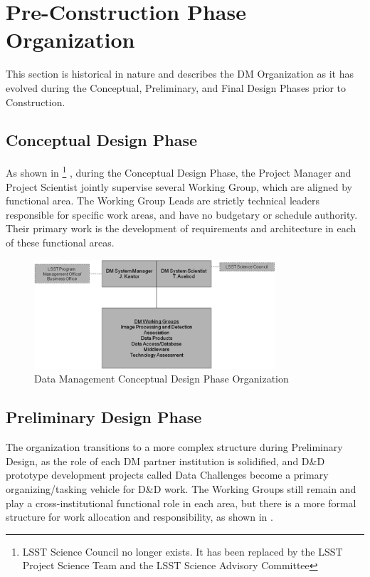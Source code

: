 \section{Pre-Construction Phase Organization}\label{sect:precon}
This section is historical in nature and describes the DM Organization as it has evolved during the Conceptual, Preliminary, and Final Design Phases prior to Construction.
\subsection{Conceptual Design Phase}
As shown in 
\footnote{LSST Science Council no longer exists. It has been replaced by the LSST Project Science Team and the LSST Science Advisory Committee }
, during the Conceptual Design Phase, the Project Manager and Project Scientist jointly supervise several Working Group, which are aligned by functional area.  The Working Group Leads are strictly technical leaders responsible for specific work areas, and have no budgetary or schedule authority.  Their primary work is the development of requirements and architecture in each of these functional areas.



\begin{figure}[htbp]
\begin{center}
 \includegraphics[width=0.8\textwidth]{images/precon}
\caption{Data Management Conceptual Design Phase Organization\label{fig:precon}}
\end{center}
\end{figure}

\subsection{
Preliminary Design Phase
}
The organization transitions to a more complex structure during Preliminary Design, as the role of each DM partner institution is solidified, and D\&D prototype development projects called Data Challenges become a primary organizing/tasking vehicle for D\&D work.  The Working Groups still remain and play a cross-institutional functional role in each area, but there is a more formal structure for work allocation and responsibility, as shown in .



